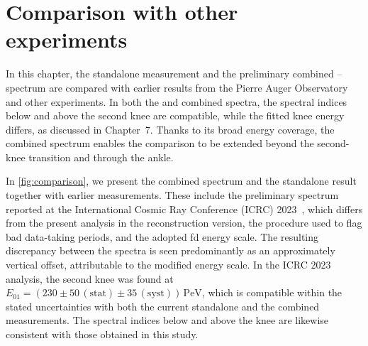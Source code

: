 \documentclass[main.tex]{subfiles}
\begin{document}
\chapter{Comparison with other experiments}
\label{chapter:comparison}

In this chapter, the standalone  measurement and the preliminary combined -- spectrum are compared with earlier results from the Pierre Auger Observatory and other experiments.
In both the  and combined spectra, the spectral indices below and above the second knee are compatible, while the fitted knee energy differs, as discussed in Chapter~7.
Thanks to its broad energy coverage, the combined spectrum enables the comparison to be extended beyond the second-knee transition and through the ankle.

In \cref{fig:comparison}, we present the combined spectrum and the standalone  result together with earlier measurements.
These include the preliminary  spectrum reported at the International Cosmic Ray Conference (ICRC) 2023~\cite{BrichettoOrquera:2023}, which differs from the present analysis in the \Offline reconstruction version, the procedure used to flag bad data-taking periods, and the adopted \gls{fd} energy scale.
The resulting discrepancy between the spectra is seen predominantly as an approximately vertical offset, attributable to the modified energy scale.
In the ICRC 2023  analysis, the second knee was found at $E_{01}=(230\pm50\,\mathrm{(stat)}\pm35\,\mathrm{(syst)})\,\mathrm{PeV}$, which is compatible within the stated uncertainties with both the current standalone  and the combined measurements.
The spectral indices below and above the knee are likewise consistent with those obtained in this study.
\end{document}
